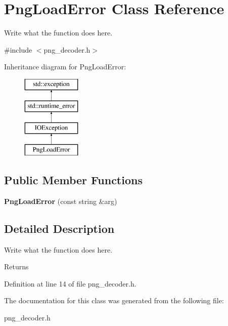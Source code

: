 \hypertarget{classPngLoadError}{\section{Png\+Load\+Error Class Reference}
\label{classPngLoadError}
}


Write what the function does here.  




{\ttfamily \#include $<$png\+\_\+decoder.\+h$>$}

Inheritance diagram for Png\+Load\+Error\+:\begin{figure}[H]
\begin{center}
\leavevmode
\includegraphics[height=4.000000cm]{classPngLoadError}
\end{center}
\end{figure}
\subsection*{Public Member Functions}
\begin{DoxyCompactItemize}
\item 
\hypertarget{classPngLoadError_afa477343655020d65c982aeedb118979}{{\bfseries Png\+Load\+Error} (const string \&arg)}\label{classPngLoadError_afa477343655020d65c982aeedb118979}

\end{DoxyCompactItemize}


\subsection{Detailed Description}
Write what the function does here. 

\begin{DoxyReturn}{Returns}

\end{DoxyReturn}


Definition at line 14 of file png\+\_\+decoder.\+h.



The documentation for this class was generated from the following file\+:\begin{DoxyCompactItemize}
\item 
png\+\_\+decoder.\+h\end{DoxyCompactItemize}
